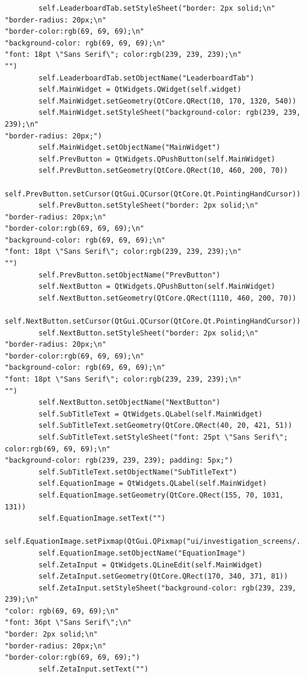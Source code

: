 \documentclass{article}
\begin{document}
\begin{lstlisting}
        self.LeaderboardTab.setStyleSheet("border: 2px solid;\n"
"border-radius: 20px;\n"
"border-color:rgb(69, 69, 69);\n"
"background-color: rgb(69, 69, 69);\n"
"font: 18pt \"Sans Serif\"; color:rgb(239, 239, 239);\n"
"")
        self.LeaderboardTab.setObjectName("LeaderboardTab")
        self.MainWidget = QtWidgets.QWidget(self.widget)
        self.MainWidget.setGeometry(QtCore.QRect(10, 170, 1320, 540))
        self.MainWidget.setStyleSheet("background-color: rgb(239, 239, 239);\n"
"border-radius: 20px;")
        self.MainWidget.setObjectName("MainWidget")
        self.PrevButton = QtWidgets.QPushButton(self.MainWidget)
        self.PrevButton.setGeometry(QtCore.QRect(10, 460, 200, 70))
        self.PrevButton.setCursor(QtGui.QCursor(QtCore.Qt.PointingHandCursor))
        self.PrevButton.setStyleSheet("border: 2px solid;\n"
"border-radius: 20px;\n"
"border-color:rgb(69, 69, 69);\n"
"background-color: rgb(69, 69, 69);\n"
"font: 18pt \"Sans Serif\"; color:rgb(239, 239, 239);\n"
"")
        self.PrevButton.setObjectName("PrevButton")
        self.NextButton = QtWidgets.QPushButton(self.MainWidget)
        self.NextButton.setGeometry(QtCore.QRect(1110, 460, 200, 70))
        self.NextButton.setCursor(QtGui.QCursor(QtCore.Qt.PointingHandCursor))
        self.NextButton.setStyleSheet("border: 2px solid;\n"
"border-radius: 20px;\n"
"border-color:rgb(69, 69, 69);\n"
"background-color: rgb(69, 69, 69);\n"
"font: 18pt \"Sans Serif\"; color:rgb(239, 239, 239);\n"
"")
        self.NextButton.setObjectName("NextButton")
        self.SubTitleText = QtWidgets.QLabel(self.MainWidget)
        self.SubTitleText.setGeometry(QtCore.QRect(40, 20, 421, 51))
        self.SubTitleText.setStyleSheet("font: 25pt \"Sans Serif\"; color:rgb(69, 69, 69);\n"
"background-color: rgb(239, 239, 239); padding: 5px;")
        self.SubTitleText.setObjectName("SubTitleText")
        self.EquationImage = QtWidgets.QLabel(self.MainWidget)
        self.EquationImage.setGeometry(QtCore.QRect(155, 70, 1031, 131))
        self.EquationImage.setText("")
        self.EquationImage.setPixmap(QtGui.QPixmap("ui/investigation_screens/../../media/riemanns_functional_equation.png"))
        self.EquationImage.setObjectName("EquationImage")
        self.ZetaInput = QtWidgets.QLineEdit(self.MainWidget)
        self.ZetaInput.setGeometry(QtCore.QRect(170, 340, 371, 81))
        self.ZetaInput.setStyleSheet("background-color: rgb(239, 239, 239);\n"
"color: rgb(69, 69, 69);\n"
"font: 36pt \"Sans Serif\";\n"
"border: 2px solid;\n"
"border-radius: 20px;\n"
"border-color:rgb(69, 69, 69);")
        self.ZetaInput.setText("")

\end{lstlisting}
\end{document}
